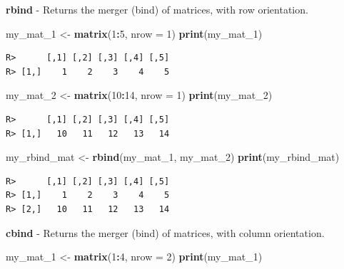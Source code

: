 \documentclass[
  12pt,
]{book}
\newenvironment{Shaded}{\begin{snugshade}}{\end{snugshade}}
\newcommand{\DataTypeTok}[1]{\textcolor[rgb]{0.27,0.27,0.27}{#1}}
\newcommand{\DecValTok}[1]{\textcolor[rgb]{0.06,0.06,0.06}{#1}}
\newcommand{\KeywordTok}[1]{\textcolor[rgb]{0.27,0.27,0.27}{\textbf{#1}}}
\newcommand{\NormalTok}[1]{#1}
\newcommand{\OperatorTok}[1]{\textcolor[rgb]{0.43,0.43,0.43}{\textbf{#1}}}
\newcommand{\StringTok}[1]{\textcolor[rgb]{0.5,0.5,0.5}{#1}}
\begin{document}
\textbf{rbind} - Returns the merger (bind) of matrices, with row orientation. 

\begin{Shaded}
\begin{Highlighting}[]
\NormalTok{my_mat_}\DecValTok{1}\NormalTok{ <-}\StringTok{ }\KeywordTok{matrix}\NormalTok{(}\DecValTok{1}\OperatorTok{:}\DecValTok{5}\NormalTok{, }\DataTypeTok{nrow =} \DecValTok{1}\NormalTok{)}
\KeywordTok{print}\NormalTok{(my_mat_}\DecValTok{1}\NormalTok{)}
\end{Highlighting}
\end{Shaded}

\begin{verbatim}
R>      [,1] [,2] [,3] [,4] [,5]
R> [1,]    1    2    3    4    5
\end{verbatim}

\begin{Shaded}
\begin{Highlighting}[]
\NormalTok{my_mat_}\DecValTok{2}\NormalTok{ <-}\StringTok{ }\KeywordTok{matrix}\NormalTok{(}\DecValTok{10}\OperatorTok{:}\DecValTok{14}\NormalTok{, }\DataTypeTok{nrow =} \DecValTok{1}\NormalTok{)}
\KeywordTok{print}\NormalTok{(my_mat_}\DecValTok{2}\NormalTok{)}
\end{Highlighting}
\end{Shaded}

\begin{verbatim}
R>      [,1] [,2] [,3] [,4] [,5]
R> [1,]   10   11   12   13   14
\end{verbatim}

\begin{Shaded}
\begin{Highlighting}[]
\NormalTok{my_rbind_mat <-}\StringTok{ }\KeywordTok{rbind}\NormalTok{(my_mat_}\DecValTok{1}\NormalTok{, my_mat_}\DecValTok{2}\NormalTok{)}
\KeywordTok{print}\NormalTok{(my_rbind_mat)}
\end{Highlighting}
\end{Shaded}

\begin{verbatim}
R>      [,1] [,2] [,3] [,4] [,5]
R> [1,]    1    2    3    4    5
R> [2,]   10   11   12   13   14
\end{verbatim}

\textbf{cbind} - Returns the merger (bind) of matrices, with column orientation. 

\begin{Shaded}
\begin{Highlighting}[]
\NormalTok{my_mat_}\DecValTok{1}\NormalTok{ <-}\StringTok{ }\KeywordTok{matrix}\NormalTok{(}\DecValTok{1}\OperatorTok{:}\DecValTok{4}\NormalTok{, }\DataTypeTok{nrow =} \DecValTok{2}\NormalTok{)}
\KeywordTok{print}\NormalTok{(my_mat_}\DecValTok{1}\NormalTok{)}
\end{Highlighting}
\end{Shaded}
\end{document}
